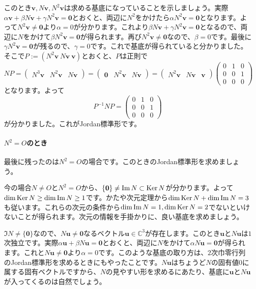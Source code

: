 このとき$\bm{v}, N\bm{v}, N^2 \bm{v}$は求める基底になっていることを示しましょう。実際$\alpha \bm{v} + \beta N\bm{v} + \gamma N^2 \bm{v} = \bm{0}$とおくと、両辺に$N^2$をかけたら$\alpha N^2\bm{v} = \bm{0}$となります。よって$N^2 \bm{v} \neq \bm{0}$より$\alpha = 0$が分かります。これより$\beta N\bm{v} + \gamma N^2 \bm{v} = \bm{0}$となるので、両辺に$N$をかけて$\beta N^2 \bm{v} = \bm{0}$が得られます。再び$N^2 \bm{v} \neq \bm{0}$なので、$\beta = 0$です。最後に$\gamma N^2\bm{v} = \bm{0}$が残るので、$\gamma = 0$です。これで基底が得られていると分かりました。そこで$P:= (N^2 \bm{v} \  N\bm{v} \ \bm{v})$とおくと、$P$は正則で
\[
NP = 
\begin{pmatrix}
N^3\bm{v} & N^2\bm{v} & N \bm{v}
\end{pmatrix}
=
\begin{pmatrix}
\bm{0} & N^2\bm{v} & N\bm{v}
\end{pmatrix}
=
\begin{pmatrix}
N^2\bm{v} & N\bm{v} & \bm{v}
\end{pmatrix}
\begin{pmatrix}
0 & 1 & 0 \\
0 & 0 & 1 \\
0 & 0 & 0
\end{pmatrix}
\]
となります。よって
\[
P^{-1} NP =
\begin{pmatrix}
0 & 1 & 0 \\
0 & 0 & 1 \\
0 & 0 & 0
\end{pmatrix}
\]
が分かりました。これがJordan標準形です。

\paragraph{$N^2 = O$のとき} 最後に残ったのは$N^2 = O$の場合です。このときのJordan標準形を求めましょう。

今の場合$N \neq O$と$N^2 = O$から、$\{\boldsymbol{0}\} \neq \mathrm{Im}\, N \subset \operatorname{Ker} N$が分かります。よって$\dim \operatorname{Ker} N \geq \dim \mathrm{Im}\, N \geq 1$です。かたや次元定理から$\dim \operatorname{Ker} N + \dim \mathrm{Im}\, N = 3$も従います。これらの次元の条件から$\dim \mathrm{Im}\, N = 1, \dim \operatorname{Ker} N = 2$でないといけないことが得られます。次元の情報を手掛かりに、良い基底を求めましょう。

$\Im N \neq \{\bm{0}\}$なので、$N \bm{u} \neq \bm{0}$なるベクトル$\bm{u} \in \mathbb{C}^3$が存在します。このとき$\bm{u}$と$N\bm{u}$は$1$次独立です。実際$\alpha \bm{u} + \beta N\bm{u} = \bm{0}$とおくと、両辺に$N$をかけて$\alpha N \bm{u} = \bm{0}$が得られます。これと$N\bm{u} \neq \bm{0}$より$\alpha = 0$です。このような基底の取り方は、$2$次巾零行列のJordan標準形を求めるときにもやったことです。$N\bm{u}$はちょうど$N$の固有値$0$に属する固有ベクトルですから、$N$の見やすい形を求めるにあたり、基底に$\bm{u}$と$N\bm{u}$が入ってくるのは自然でしょう。

